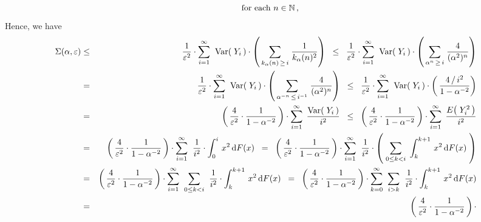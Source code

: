 \begin{enumerate}
\begin{equation*}
\quad
\textnormal{for each $n \in \mathbb{N}$}\,,
\end{equation*}
Hence, we have
\begin{eqnarray*}
\Sigma(\alpha,\varepsilon)
& \leq &
	\dfrac{1}{\varepsilon^{2}} \cdot
	\overset{\infty}{\underset{i=1}{\sum}}\;\;
	\Var\!\left(\;Y_{i}\,\right)
		\cdot
		\left(\,
			\underset{k_{\alpha}(n)\,\geq\,i}{\sum}\;
			\dfrac{1}{k_{\alpha}(n)^{2}}
			\right)
	\;\; \leq \;\;
	\dfrac{1}{\varepsilon^{2}} \cdot
	\overset{\infty}{\underset{i=1}{\sum}}\;\;
	\Var\!\left(\;Y_{i}\,\right)
		\cdot
		\left(\,
			\underset{\alpha^{n}\,\geq\,i}{\sum}\;
			\dfrac{4}{(\alpha^{2})^{n}}
			\right)
\\
& = &
	\dfrac{1}{\varepsilon^{2}} \cdot
	\overset{\infty}{\underset{i=1}{\sum}}\;\;
	\Var\!\left(\;Y_{i}\,\right)
		\cdot
		\left(\,
			\underset{\alpha^{-n}\,\leq\,i^{-1}}{\sum}\;
			\dfrac{4}{(\alpha^{2})^{n}}
			\right)
	\;\; \leq \;\;
	\dfrac{1}{\varepsilon^{2}} \cdot
	\overset{\infty}{\underset{i=1}{\sum}}\;\;
	\Var\!\left(\;Y_{i}\,\right)
		\cdot
		\left(\,
			\dfrac{4\,/\,i^{2}}{1-\alpha^{-2}}
			\right)
\\
& = &
	\left(\,\dfrac{4}{\varepsilon^{2}} \cdot \dfrac{1}{1-\alpha^{-2}}\,\right) \cdot
	\overset{\infty}{\underset{i=1}{\sum}}\;\,
	\dfrac{\Var\!\left(\;Y_{i}\,\right)}{i^{2}}
	\;\; \leq \;\;
	\left(\,\dfrac{4}{\varepsilon^{2}} \cdot \dfrac{1}{1-\alpha^{-2}}\,\right) \cdot
	\overset{\infty}{\underset{i=1}{\sum}}\;\,
	\dfrac{E\!\left(\;Y_{i}^{2}\,\right)}{i^{2}}
\\
& = &
	\left(\,\dfrac{4}{\varepsilon^{2}} \cdot \dfrac{1}{1-\alpha^{-2}}\,\right) \cdot
	\overset{\infty}{\underset{i=1}{\sum}}\;\;
	\dfrac{1}{i^{2}} \cdot \int_{0}^{i}\, x^{2} \,\d F(x)
	\;\; = \;\;
	\left(\,\dfrac{4}{\varepsilon^{2}} \cdot \dfrac{1}{1-\alpha^{-2}}\,\right) \cdot
	\overset{\infty}{\underset{i=1}{\sum}}\;\;
	\dfrac{1}{i^{2}} \cdot 
	\left(\;
		\underset{0 \leq k < i}{\sum}\;\int_{k}^{k+1}\, x^{2} \,\d F(x)
		\;\right)
\\
& = &
	\left(\,\dfrac{4}{\varepsilon^{2}} \cdot \dfrac{1}{1-\alpha^{-2}}\,\right) \cdot
	\overset{\infty}{\underset{i=1}{\sum}}\;\;
	\underset{0 \leq k < i}{\sum}\;\;
	\dfrac{1}{i^{2}} \cdot  \int_{k}^{k+1}\, x^{2} \,\d F(x)
	\;\; = \;\;
	\left(\,\dfrac{4}{\varepsilon^{2}} \cdot \dfrac{1}{1-\alpha^{-2}}\,\right) \cdot
	\overset{\infty}{\underset{k=0}{\sum}}\;\;
	\underset{i > k}{\sum}\;\;
	\dfrac{1}{i^{2}} \cdot  \int_{k}^{k+1}\, x^{2} \,\d F(x)
\\
& = &
	\left(\,\dfrac{4}{\varepsilon^{2}} \cdot \dfrac{1}{1-\alpha^{-2}}\,\right) \cdot

\end{eqnarray*}
\end{enumerate}
